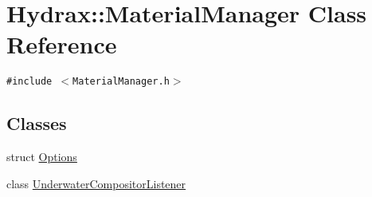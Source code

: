 \hypertarget{class_hydrax_1_1_material_manager}{
\section{Hydrax::MaterialManager Class Reference}
\label{class_hydrax_1_1_material_manager}
}
{\tt \#include $<$MaterialManager.h$>$}

\subsection*{Classes}
\begin{CompactItemize}
\item 
struct \hyperlink{struct_hydrax_1_1_material_manager_1_1_options}{Options}
\item 
class \hyperlink{class_hydrax_1_1_material_manager_1_1_underwater_compositor_listener}{UnderwaterCompositorListener}
\end{CompactItemize}
